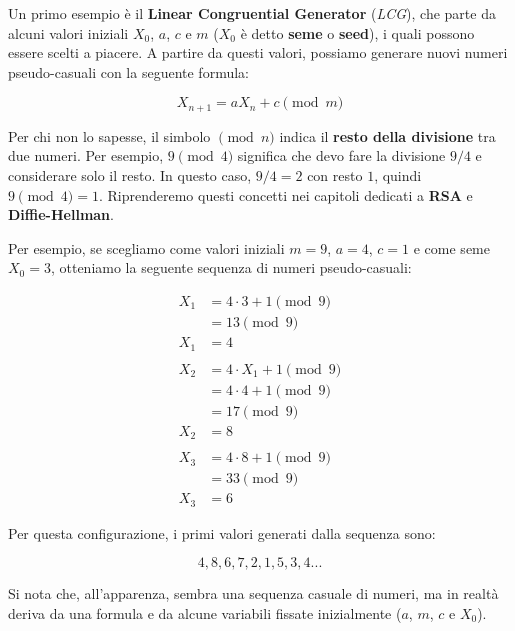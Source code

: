 \documentclass{rapport}
\begin{document}
Un primo esempio è il \textbf{Linear Congruential Generator} (\textit{LCG}), che parte da alcuni valori iniziali $X_0$, $a$, $c$ e $m$ ($X_0$ è detto \textbf{seme} o \textbf{seed}), i quali possono essere scelti a piacere.  
A partire da questi valori, possiamo generare nuovi numeri pseudo-casuali con la seguente formula:


\begin{equation*}
    X_{n+1} = aX_n + c \pmod{m}
\end{equation*}

Per chi non lo sapesse, il simbolo $\pmod{n}$ indica il \textbf{resto della divisione} tra due numeri.  
Per esempio, $9 \pmod{4}$ significa che devo fare la divisione $9/4$ e considerare solo il resto.  
In questo caso, $9/4 = 2$ con resto $1$, quindi $9 \pmod{4} = 1$.  
Riprenderemo questi concetti nei capitoli dedicati a \textbf{RSA} e \textbf{Diffie-Hellman}.


Per esempio, se scegliamo come valori iniziali $m = 9$, $a = 4$, $c = 1$ e come seme $X_0 = 3$, otteniamo la seguente sequenza di numeri pseudo-casuali:


\begin{align*}
    X_1 &= 4 \cdot 3 + 1 \pmod{9} \\
        &= 13 \pmod{9} \\
    X_1  &= 4
    \\
    \\
    X_2 &= 4 \cdot X_1 + 1 \pmod{9} \\
        &= 4 \cdot 4 + 1 \pmod{9} \\
        &= 17 \pmod{9} \\
    X_2 &= 8 
    \\
    \\
    X_3 &= 4 \cdot 8 + 1 \pmod{9} \\
        &= 33 \pmod{9} \\
    X_3 &= 6
\end{align*}

Per questa configurazione, i primi valori generati dalla sequenza sono:

\begin{equation*}
    4, 8, 6, 7 ,2, 1, 5, 3, 4 ... 
\end{equation*}

Si nota che, all'apparenza, sembra una sequenza casuale di numeri, ma in realtà deriva da una formula e da alcune variabili fissate inizialmente ($a$, $m$, $c$ e $X_0$).
\end{document}
